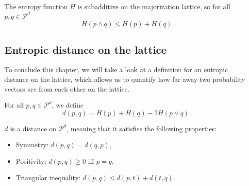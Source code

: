 \begin{theorem}
    The entropy function $H$ is subadditive on the majorization lattice, so for all $p, q \in \mathcal{P}^d$
    \begin{equation}
        H(p \wedge q) \leq H(p) + H(q)
    \end{equation}
\end{theorem}



\subsection{Entropic distance on the lattice}

To conclude this chapter, we will take a look at a definition for an entropic distance on the lattice, which allows us to quantify how far away two probability vectors are from each other on the lattice.

\begin{definition}
    For all $p, q \in \mathcal{P}^d$, we define
    \begin{equation}
        d(p, q) = H(p) + H(q) - 2H(p \vee q).
    \end{equation}
\end{definition}

\begin{theorem}
    $d$ is a distance on $\mathcal{P}^d$, meaning that it satisfies the following properties:
    \begin{itemize}
        \item Symmetry: $d(p, q) = d(q, p)$,
        \item Positivity: $d(p, q) \geq 0$  iff $p = q$,
        \item Triangular inequality: $d(p, q) \leq d(p, t) + d(t, q)$.
    \end{itemize}
\end{theorem}